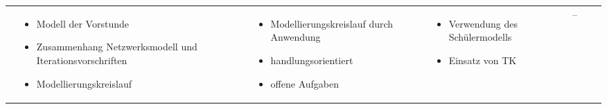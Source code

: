 \begin{landscape}
\begin{longtable}{|C{0.05\textwidth}|L{0.2\textwidth}|L{0.3\textwidth}|L{0.25\textwidth}|L{0.3\textwidth}|L{0.25\textwidth}|L{0.1\textwidth}|}
\begin{itemize}
\end{itemize}&\begin{itemize}
	\item Modell der Vorstunde
	\item Zu\-sam\-men\-hang Netzwerksmodell und Iterationsvorschriften
	\item Modellierungs\-kreislauf
\end{itemize}&\begin{itemize}
	\item Modellierungs\-kreislauf durch Anwendung
	\item handlungs\-orientiert
	\item offene Aufgaben
\end{itemize}&\begin{itemize}
	\item Verwendung des Schülermodells
	\item Einsatz von TK
\end{itemize}&--\\
\end{longtable}
\end{landscape}